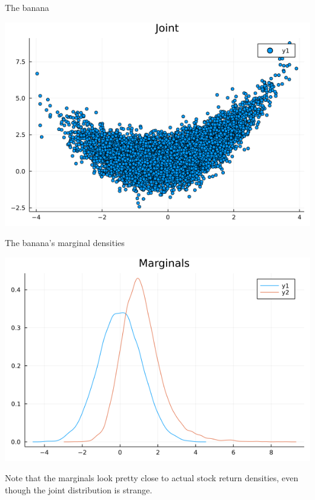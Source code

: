 \documentclass[
  ignorenonframetext,
]{beamer}
\begin{document}
\begin{frame}{The banana}
\protect\hypertarget{the-banana}{}
\begin{center}\includegraphics[width=0.5\paperheight]{complexity_files/figure-beamer/unnamed-chunk-8-1} \end{center}
\end{frame}

\begin{frame}{The banana's marginal densities}
\protect\hypertarget{the-bananas-marginal-densities}{}
\begin{center}\includegraphics[width=0.5\paperheight]{complexity_files/figure-beamer/unnamed-chunk-9-1} \end{center}

Note that the marginals look pretty close to actual stock return
densities, even though the joint distribution is strange.
\end{frame}
\end{document}
